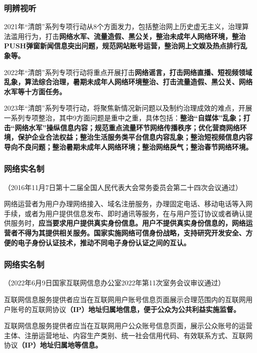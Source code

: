 \documentclass[dvipsnames, svgnames, x11names]{beamer}
\begin{document}
\begin{frame}
    \frametitle{明辨视听}
\begin{center}
\end{center}
    \qquad 2021年“清朗”系列专项行动从8个方面发力，包括整治网上历史虚无主义，治理算法滥用行为，打击\bf{网络水军}、流量造假、黑公关，整治未成年人网络环境，整治PUSH弹窗新闻信息突出问题，规范网站账号运营，整治网上文娱及热点排行乱象等。

    \qquad 2022年“清朗”系列专项行动将重点开展打击\bf{网络谣言}，打击网络直播、短视频领域乱象，算法综合治理，暑期未成年人网络环境整治、打击流量造假、黑公关、\bf{网络水军}等十方面任务。
    
    \qquad 2023年“清朗”系列专项行动，将聚焦新情况新问题以及制约治理成效的难点，开展一系列专项整治，其中9方面问题是重中之重，具体包括：\bf{整治“自媒体”乱象；打击“网络水军”操纵信息内容}；规范重点流量环节网络传播秩序；优化营商网络环境，保护企业合法权益；整治生活服务类平台信息内容乱象；整治短视频信息内容导向不良问题；整治暑期未成年人网络环境；整治网络戾气；整治春节网络环境。
\end{frame}


\begin{frame}
    \frametitle{网络实名制}
    \begin{center}

\small（2016年11月7日第十二届全国人民代表大会常务委员会第二十四次会议通过）

    \end{center}
    \quad 网络运营者为用户办理网络接入、域名注册服务，办理固定电话、移动电话等入网手续，或者为用户提供信息发布、即时通讯等服务，在与用户签订协议或者确认提供服务时，\bf{应当要求用户提供真实身份信息。用户不提供真实身份信息的，网络运营者不得为其提供相关服务}。国家实施网络可信身份战略，支持研究开发安全、方便的电子身份认证技术，推动不同电子身份认证之间的互认。
\end{frame}

\begin{frame}
    \frametitle{网络实名制}
    \begin{center}

\small（2022年6月9日国家互联网信息办公室2022年第11次室务会议审议通过）

    \end{center}
    \quad 互联网信息服务提供者应当在互联网用户账号信息页面展示合理范围内的互联网用户账号的互联网协议\bf{（IP）地址归属地}信息，便于公众为公共利益实施监督。

    \quad 互联网信息服务提供者应当在互联网用户公众账号信息页面，展示公众账号的运营主体、注册运营地址、内容生产类别、统一社会信用代码、有效联系方式、互联网协议\bf{（IP）地址归属地}等信息。
\end{frame}
\end{document}
